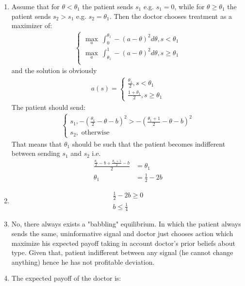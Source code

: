 \documentclass[a4paper]{article}
\begin{document}
\begin{enumerate}
	\item Assume that for $\theta < \theta_1$ the patient sends $s_1$ e.g. $s_1 = 0$, while for $\theta \ge \theta_1$ the patient sends $s_2 > s_1$ e.g. $s_2 = \theta_1$. Then the doctor chooses treatment as a maximizer of:
	\begin{align*}
	\begin{cases}
	\underset{a}{\max}\ \int_{0}^{\theta_1} -(a - \theta)^2d\theta, s < \theta_1\\
	\underset{a}{\max}\ \int_{\theta_1}^{1} -(a - \theta)^2d\theta, s \ge \theta_1\\
	\end{cases}
	\end{align*}
	and the solution is obviously
	\begin{align*}
	a(s) = \begin{cases}
	\frac{\theta_1}{2}, s < \theta_1\\
	\frac{1 + \theta_1}{2}, s \ge \theta_1
	\end{cases}
	\end{align*}
	The patient should send:
	\begin{align*}
	\begin{cases}s_1, -\left(\frac{\theta_1}{2} - \theta - b\right)^2 > -\left(\frac{\theta_1 + 1}{2} - \theta - b\right)^2\\
	s_2, \text{ otherwise}
	\end{cases}
	\end{align*}
	That means that $\theta_1$ should be such that the patient becomes indifferent between sending $s_1$ and $s_2$ i.e.
	\begin{align*}
	\frac{\frac{\theta_1}{2} - b + \frac{\theta_1+1}{2} - b}{2} &= \theta_1\\
	\theta_1 &= \frac{1}{2} - 2b
	\end{align*}
	\item 
	\begin{align*}
	\frac{1}{2} - 2b \ge 0\\
	b \le \frac{1}{4}
	\end{align*}
	\item No, there always exists a "babbling" equilibrium. In which the patient always sends the same, uninformative signal and doctor just chooses action which maximize his expected payoff taking in account doctor's prior beliefs about type. Given that, patient indifferent between any signal (he cannot change anything) hence he has not profitable deviation.
	\item The expected payoff of the doctor is:

\end{enumerate}
\end{document}
